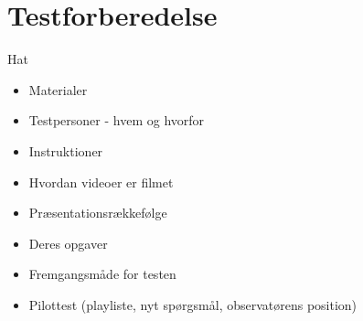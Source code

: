 \section{Testforberedelse}
\label{Testforberedelse}
%
Hat
%
\begin{itemize}
  \item Materialer
  \item Testpersoner - hvem og hvorfor
  \item Instruktioner
  \item Hvordan videoer er filmet
  \item Præsentationsrækkefølge 
  \item Deres opgaver
  \item Fremgangsmåde for testen 
  \item Pilottest (playliste, nyt spørgsmål, observatørens position)
\end{itemize}
